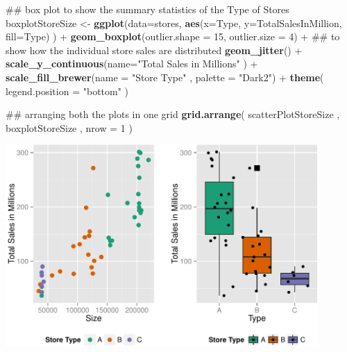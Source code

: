 \documentclass[]{article}
\newenvironment{Shaded}{\begin{snugshade}}{\end{snugshade}}
\newcommand{\KeywordTok}[1]{\textcolor[rgb]{0.13,0.29,0.53}{\textbf{{#1}}}}
\newcommand{\DataTypeTok}[1]{\textcolor[rgb]{0.13,0.29,0.53}{{#1}}}
\newcommand{\DecValTok}[1]{\textcolor[rgb]{0.00,0.00,0.81}{{#1}}}
\newcommand{\StringTok}[1]{\textcolor[rgb]{0.31,0.60,0.02}{{#1}}}
\newcommand{\NormalTok}[1]{{#1}}
\begin{document}
\begin{Shaded}
\begin{Highlighting}[]
\NormalTok{## box plot to show the summary statistics of the Type of Stores}
\NormalTok{boxplotStoreSize <-}\StringTok{ }\KeywordTok{ggplot}\NormalTok{(}\DataTypeTok{data=}\NormalTok{stores, }
       \KeywordTok{aes}\NormalTok{(}\DataTypeTok{x=}\NormalTok{Type, }\DataTypeTok{y=}\NormalTok{TotalSalesInMillion, }\DataTypeTok{fill=}\NormalTok{Type) ) +}\StringTok{ }
\StringTok{  }\KeywordTok{geom_boxplot}\NormalTok{(}\DataTypeTok{outlier.shape =} \DecValTok{15}\NormalTok{, }\DataTypeTok{outlier.size =} \DecValTok{4}\NormalTok{) +}
\StringTok{  }\NormalTok{## to show how the individual store sales are distributed}
\StringTok{  }\KeywordTok{geom_jitter}\NormalTok{() +}
\StringTok{  }\KeywordTok{scale_y_continuous}\NormalTok{(}\DataTypeTok{name=}\StringTok{"Total Sales in Millions"} \NormalTok{) +}
\StringTok{  }\KeywordTok{scale_fill_brewer}\NormalTok{(}\DataTypeTok{name =} \StringTok{"Store Type"} \NormalTok{, }\DataTypeTok{palette =} \StringTok{"Dark2"}\NormalTok{) +}
\StringTok{  }\KeywordTok{theme}\NormalTok{( }\DataTypeTok{legend.position =} \StringTok{"bottom"} \NormalTok{)}
\end{Highlighting}
\end{Shaded}

\begin{Shaded}
\begin{Highlighting}[]
\NormalTok{## arranging both the plots in one grid}
\KeywordTok{grid.arrange}\NormalTok{( scatterPlotStoreSize , boxplotStoreSize , }\DataTypeTok{nrow =} \DecValTok{1} \NormalTok{)}
\end{Highlighting}
\end{Shaded}

\includegraphics[width=450px]{PredictingWeeklySalesAtWalmart_files/figure-latex/storeTypeScatterBoxGrid-1}
\end{document}
